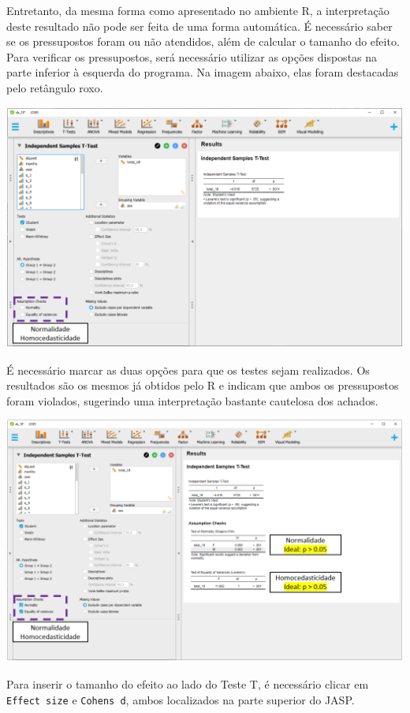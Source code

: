 \documentclass[
]{book}
\begin{document}
Entretanto, da mesma forma como apresentado no ambiente R, a
interpretação deste resultado não pode ser feita de uma forma
automática. É necessário saber se os pressupostos foram ou não
atendidos, além de calcular o tamanho do efeito. Para verificar os
pressupostos, será necessário utilizar as opções dispostas na parte
inferior à esquerda do programa. Na imagem abaixo, elas foram destacadas
pelo retângulo roxo.

\includegraphics{./img/cap_testet_pressupostos.png}

É necessário marcar as duas opções para que os testes sejam realizados.
Os resultados são os mesmos já obtidos pelo R e indicam que ambos os
pressupostos foram violados, sugerindo uma interpretação bastante
cautelosa dos achados.

\includegraphics{./img/cap_testet_pressupostos2.png}

Para inserir o tamanho do efeito ao lado do Teste T, é necessário clicar
em \texttt{Effect\ size} e \texttt{Cohen\textquotesingle{}s\ d}, ambos
localizados na parte superior do JASP.
\end{document}
